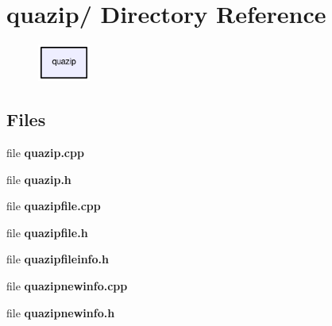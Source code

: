 \section{quazip/ Directory Reference}
\label{dir_d5f2bee049160df10aa2fd550557f61f}


\nopagebreak
\begin{figure}[H]
\begin{center}
\leavevmode
\includegraphics[width=49pt]{dir_d5f2bee049160df10aa2fd550557f61f_dep}
\end{center}
\end{figure}
\subsection*{Files}
\begin{CompactItemize}
\item 
file \textbf{quazip.cpp}
\item 
file \textbf{quazip.h}
\item 
file \textbf{quazipfile.cpp}
\item 
file \textbf{quazipfile.h}
\item 
file \textbf{quazipfileinfo.h}
\item 
file \textbf{quazipnewinfo.cpp}
\item 
file \textbf{quazipnewinfo.h}
\end{CompactItemize}

